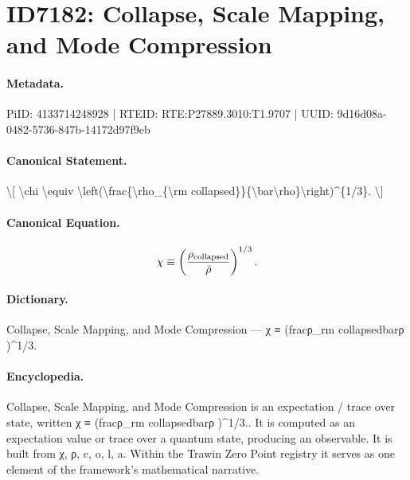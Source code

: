 \section*{ID7182: Collapse, Scale Mapping, and Mode Compression}
\paragraph{Metadata.}
PiID: 4133714248928 | RTEID: RTE:P27889.3010:T1.9707 | UUID: 9d16d08a-0482-5736-847b-14172d97f9eb

\paragraph{Canonical Statement.}
\textbackslash{}[ \textbackslash{}chi \textbackslash{}equiv \textbackslash{}left(\textbackslash{}frac\{\textbackslash{}rho\_\{\textbackslash{}rm collapsed\}\}\{\textbackslash{}bar\textbackslash{}rho\}\textbackslash{}right)\textasciicircum{}\{1/3\}. \textbackslash{}]

\paragraph{Canonical Equation.}
\[
\chi \equiv \left(\frac{\rho_{\rm collapsed}}{\bar\rho}\right)^{1/3}.
\]

\paragraph{Dictionary.}
Collapse, Scale Mapping, and Mode Compression — χ ≡ (fracρ\_rm collapsedbarρ )\textasciicircum{}1/3.

\paragraph{Encyclopedia.}
Collapse, Scale Mapping, and Mode Compression is an expectation / trace over state, written χ ≡ (fracρ\_rm collapsedbarρ )\textasciicircum{}1/3.. It is computed as an expectation value or trace over a quantum state, producing an observable. It is built from χ, ρ, c, o, l, a. Within the Trawin Zero Point registry it serves as one element of the framework's mathematical narrative.
